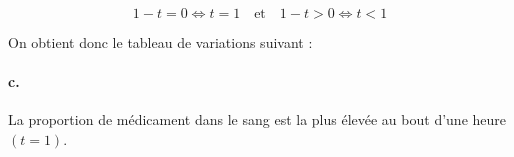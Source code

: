 \[
1 - t = 0 \iff t = 1 \quad \text{et} \quad 1 - t > 0 \iff t < 1
\]

On obtient donc le tableau de variations suivant :

\begin{center}
\end{center}

\paragraph{c.} La proportion de médicament dans le sang est la plus élevée au bout d'une heure \((t = 1)\).
